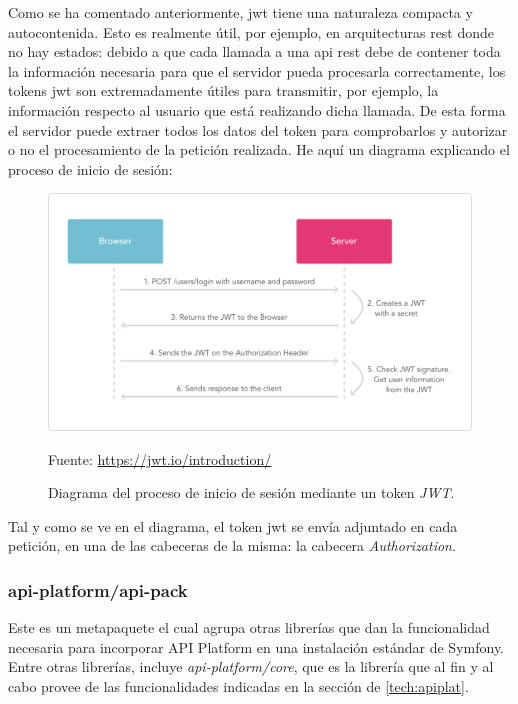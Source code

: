 Como se ha comentado anteriormente, \gls{jwt} tiene una naturaleza compacta y
autocontenida. Esto es realmente útil, por ejemplo, en arquitecturas \gls{rest}
donde no hay estados: debido a que cada llamada a una \gls{api} \gls{rest} debe
de contener toda la información necesaria para que el servidor pueda procesarla
correctamente, los tokens \gls{jwt} son extremadamente útiles para transmitir,
por ejemplo, la información respecto al usuario que está realizando dicha
llamada. De esta forma el servidor puede extraer todos los datos del token para
comprobarlos y autorizar o no el procesamiento de la petición realizada. He
aquí un diagrama explicando el proceso de inicio de sesión:

\begin{figure}[h]
    \center
    \includegraphics[scale=0.2]{img/jwt-diagram}
    \caption{Diagrama del proceso de inicio de sesión mediante un token
      \textit{JWT}.}
    Fuente: \url{https://jwt.io/introduction/}
\end{figure}

Tal y como se ve en el diagrama, el token \gls{jwt} se envía adjuntado en cada
petición, en una de las cabeceras de la misma: la cabecera
\textit{Authorization}.

\subsubsection{api-platform/api-pack}
\label{sec:tech:apipack}
Este es un metapaquete el cual agrupa otras librerías que dan la funcionalidad
necesaria para incorporar API Platform en una instalación estándar de Symfony.
Entre otras librerías, incluye \textit{api-platform/core}, que es la librería
que al fin y al cabo provee de las funcionalidades indicadas en la sección de
 \ref{tech:apiplat}.
